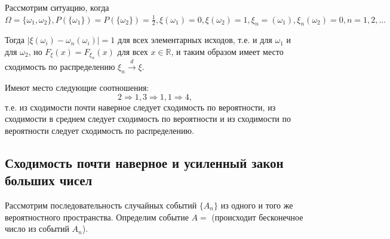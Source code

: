 \begin{exmp}
	Рассмотрим ситуацию, когда $\Omega = \{ \omega_1, \omega_2 \}, P( \{ \omega_1 \} ) = P( \{ \omega_2 \} ) = \frac{1}{2}, \xi ( \omega_1 ) = 0, \xi ( \omega_2 ) = 1, \xi_n = ( \omega_1 ), \xi_n ( \omega_2 ) = 0, n = 1, 2, \dots$
	
	Тогда $| \xi (\omega_i) - \omega_n (\omega_i) | = 1$ для всех элементарных исходов, т.е. и для $\omega_1$ и для $\omega_2$, но $F_{\xi} (x) = F_{\xi_n} (x)$ для всех $x \in \mathbb{R}$, и таким образом имеет место сходимость по распределению $\xi_n \overset{d}{\to} \xi$.
\end{exmp}

\begin{theorem}
	Имеют место следующие соотношения:
	\[ 2 \Rightarrow 1, 3 \Rightarrow 1, 1 \Rightarrow 4, \]
	т.е. из сходимости почти наверное следует сходимость по вероятности, из сходимости в среднем следует сходимость по вероятности и из сходимости по вероятности следует сходимость по распределению.
	\begin{figure}[H]
	\end{figure}
\end{theorem}

\subsection{Сходимость почти наверное и усиленный закон больших чисел}

Рассмотрим последовательность случайных событий $\{ A_n \}$ из одного и того же вероятностного пространства. Определим событие $A = $ (происходит бесконечное число из событий $A_n$).

